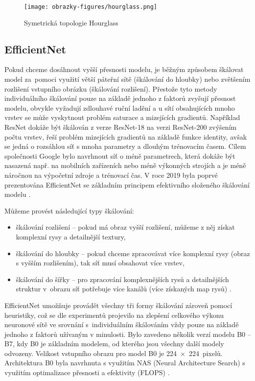 \begin{figure}[!htbp]
    \centering
    \texttt{[image: obrazky-figures/hourglass.png]}
    \caption{Symetrická topologie Hourglass \cite{Hourglass}}
    \label{fig:hourglass}
\end{figure}
\subsection{EfficientNet}
Pokud chceme dosáhnout vyšší přesnosti modelu, je běžným způsobem škálovat model za~pomoci využití větší páteřní sítě (škálování do hloubky) nebo zvětšením rozlišení vstupního obrázku (škálování rozlišení). Přestože tyto metody individuálního škálování pouze na základě jednoho z faktorů zvyšují přesnost modelu, obvykle vyžadují zdlouhavé ruční ladění a u sítí obsahujících mnoho vrstev se může vyskytnout problém saturace a mizejících gradientů. Například ResNet dokáže být škálován z verze ResNet-18 na verzi ResNet-200 zvýšením počtu vrstev, řeší problém mizejících gradientů na základě funkce identity, avšak se jedná o rozsáhlou síť s mnoha parametry a dlouhým trénovacím časem. Cílem společnosti Google bylo navrhnout síť o méně parametrech, která dokáže být nasazená např. na mobilních zařízeních nebo méně výkonných strojích a  je méně náročnou na výpočetní zdroje a trénovací čas. V roce 2019 byla poprvé prezentována EfficientNet se základním principem efektivního složeného škálování modelu \cite{EfficientNet, EfficientNetBlog}. 

Můžeme provést následující typy škálování:
\begin{itemize}
    \item škálování rozlišení -- pokud má obraz vyšší rozlišení, můžeme z něj získat komplexní rysy a detailnější textury,
    \item škálování do hloubky -- pokud chceme zpracovávat více komplexní rysy (obraz s vyšším rozlišením), tak síť musí obsahovat více vrstev,
    \item škálování do šířky -- pro zpracování komplexnějších rysů a detailnějších struktur v~obrazu síť potřebuje více kanálů (více získaných map rysů) \cite{EfficientNet, EfficientNetBlog}.
\end{itemize}

EfficientNet umožňuje provádět všechny tři formy škálování zároveň pomocí heuristiky, což se dle experimentů projevilo na zlepšení celkového výkonu neuronové sítě ve srovnání s~individuálním škálováním vždy pouze na základě jednoho z faktorů užívaným v minulosti.  Bylo zavedeno několik verzí modelu B0 -- B7, kdy B0 je základním modelem, od kterého jsou všechny další modely odvozeny. Velikost vstupního obrazu pro model B0 je 224~$\times$~224~pixelů. Architektura B0 byla navrhnuta s využitím NAS (Neural Architecture Search) s využitím optimalizace přesnosti a efektivity (FLOPS) \cite{EfficientNet, EfficientNetBlog}.

